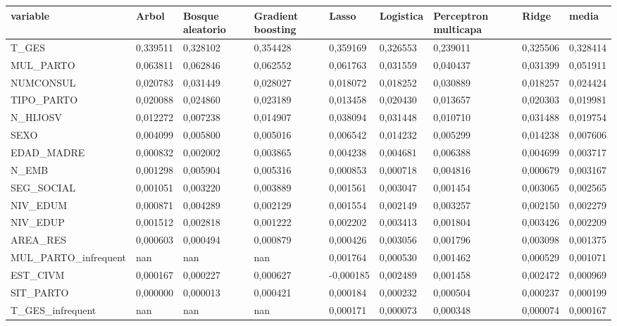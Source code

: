 \begin{tabular}{lllllllll}
\toprule
variable & Arbol & Bosque aleatorio & Gradient boosting & Lasso & Logistica & Perceptron multicapa & Ridge & media \\
\midrule
T\_GES & 0{,}339511 & 0{,}328102 & 0{,}354428 & 0{,}359169 & 0{,}326553 & 0{,}239011 & 0{,}325506 & 0{,}328414 \\
MUL\_PARTO & 0{,}063811 & 0{,}062846 & 0{,}062552 & 0{,}061763 & 0{,}031559 & 0{,}040437 & 0{,}031399 & 0{,}051911 \\
NUMCONSUL & 0{,}020783 & 0{,}031449 & 0{,}028027 & 0{,}018072 & 0{,}018252 & 0{,}030889 & 0{,}018257 & 0{,}024424 \\
TIPO\_PARTO & 0{,}020088 & 0{,}024860 & 0{,}023189 & 0{,}013458 & 0{,}020430 & 0{,}013657 & 0{,}020303 & 0{,}019981 \\
N\_HIJOSV & 0{,}012272 & 0{,}007238 & 0{,}014907 & 0{,}038094 & 0{,}031448 & 0{,}010710 & 0{,}031488 & 0{,}019754 \\
SEXO & 0{,}004099 & 0{,}005800 & 0{,}005016 & 0{,}006542 & 0{,}014232 & 0{,}005299 & 0{,}014238 & 0{,}007606 \\
EDAD\_MADRE & 0{,}000832 & 0{,}002002 & 0{,}003865 & 0{,}004238 & 0{,}004681 & 0{,}006388 & 0{,}004699 & 0{,}003717 \\
N\_EMB & 0{,}001298 & 0{,}005904 & 0{,}005316 & 0{,}000853 & 0{,}000718 & 0{,}004816 & 0{,}000679 & 0{,}003167 \\
SEG\_SOCIAL & 0{,}001051 & 0{,}003220 & 0{,}003889 & 0{,}001561 & 0{,}003047 & 0{,}001454 & 0{,}003065 & 0{,}002565 \\
NIV\_EDUM & 0{,}000871 & 0{,}004289 & 0{,}002129 & 0{,}001554 & 0{,}002149 & 0{,}003257 & 0{,}002150 & 0{,}002279 \\
NIV\_EDUP & 0{,}001512 & 0{,}002818 & 0{,}001222 & 0{,}002202 & 0{,}003413 & 0{,}001804 & 0{,}003426 & 0{,}002209 \\
AREA\_RES & 0{,}000603 & 0{,}000494 & 0{,}000879 & 0{,}000426 & 0{,}003056 & 0{,}001796 & 0{,}003098 & 0{,}001375 \\
MUL\_PARTO\_infrequent & nan & nan & nan & 0{,}001764 & 0{,}000530 & 0{,}001462 & 0{,}000529 & 0{,}001071 \\
EST\_CIVM & 0{,}000167 & 0{,}000227 & 0{,}000627 & -0{,}000185 & 0{,}002489 & 0{,}001458 & 0{,}002472 & 0{,}000969 \\
SIT\_PARTO & 0{,}000000 & 0{,}000013 & 0{,}000421 & 0{,}000184 & 0{,}000232 & 0{,}000504 & 0{,}000237 & 0{,}000199 \\
T\_GES\_infrequent & nan & nan & nan & 0{,}000171 & 0{,}000073 & 0{,}000348 & 0{,}000074 & 0{,}000167 \\

\end{tabular}
